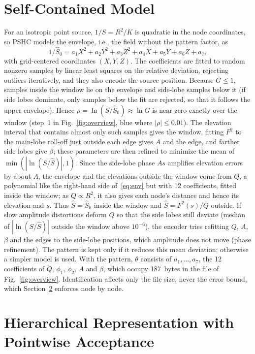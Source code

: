 \documentclass[conference]{IEEEtran}
\begin{document}
\section{Self-Contained Model}\label{sec:ident}

For an isotropic point source, $1/S=R^2/K$ is quadratic in the node coordinates, so PSHC models the envelope, i.e., the field without the pattern factor, as
\begin{equation}
1/\hat S_0=a_1X^2+a_2Y^2+a_3Z^2+a_4X+a_5Y+a_6Z+a_7,
\label{eq:env}
\end{equation}
with grid-centered coordinates $(X,Y,Z)$. The coefficients are fitted to random nonzero samples by linear least squares on the relative deviation, rejecting outliers iteratively, and they also encode the source position. Because $G\le1$, samples inside the window lie on the envelope and side-lobe samples below it (if side lobes dominate, only samples below the fit are rejected, so that it follows the upper envelope). Hence $\rho=\ln(S/\hat S_0)\approx\ln G$ is near zero exactly over the window (step~1 in Fig.~\ref{fig:overview}, blue where $|\rho|\le0.01$). The elevation interval that contains almost only such samples gives the window, fitting $F^2$ to the main-lobe roll-off just outside each edge gives $A$ and the edge, and farther side lobes give $\beta$; these parameters are then refined to minimize the mean of $\min(|\ln(S/\hat S)|,1)$. Since the side-lobe phase $As$ amplifies elevation errors by about $A$, the envelope and the elevations outside the window come from $Q$, a polynomial like the right-hand side of~\eqref{eq:env} but with 12 coefficients, fitted inside the window; as $Q\propto R^2$, it also gives each node's distance and hence its elevation and $s$. Thus $\hat S=\hat S_0$ inside the window and $\hat S=F^2(s)/Q$ outside. If slow amplitude distortions deform $Q$ so that the side lobes still deviate (median of $|\ln(S/\hat S)|$ outside the window above $10^{-6}$), the encoder tries refitting $Q$, $A$, $\beta$ and the edges to the side-lobe positions, which amplitude does not move (phase refinement). The pattern is kept only if it reduces this mean deviation; otherwise a simpler model is used. With the pattern, $\theta$ consists of $a_1,\dots,a_7$, the 12 coefficients of $Q$, $\phi_1$, $\phi_2$, $A$ and $\beta$, which occupy 187~bytes in the file of Fig.~\ref{fig:overview}. Identification affects only the file size, never the error bound, which Section~\ref{sec:tree} enforces node by node.

\section{Hierarchical Representation with Pointwise Acceptance}\label{sec:tree}
\end{document}
